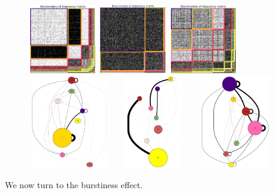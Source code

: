 \begin{figure}[h]
	\centering
	
	\includegraphics[width=2.94cm, height=3cm]{img/M_g_peaks/figure_6}
	\endminipage
	\includegraphics[width=2.94cm, height=3cm]{img/M_g_power_law/figure_6}
	\endminipage
	\includegraphics[width=2.94cm, height=3cm]{img/M_g_regular/figure_6}
	\endminipage
    \vspace{0.3cm}
	\includegraphics[width=3.5cm, height=4cm]{img/M_g_peaks/graph_dot}
	\endminipage
	\includegraphics[width=3.5cm, height=4cm]{img/M_g_power_law/graph_dot} 
	\endminipage
	\includegraphics[width=3.5cm, height=4cm]{img/M_g_regular/graph_dot}
	\endminipage
	\caption{}
	\label{fig:gen_blocks}
\end{figure}


 We now turn to the burstiness effect.
